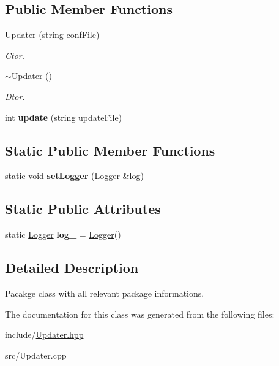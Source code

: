 \subsection*{Public Member Functions}
\begin{DoxyCompactItemize}
\item 
\hypertarget{classUpdater_aa950c2607183639f95deff560e001602}{\hyperlink{classUpdater_aa950c2607183639f95deff560e001602}{Updater} (string conf\-File)}\label{classUpdater_aa950c2607183639f95deff560e001602}

\begin{DoxyCompactList}\small\item\em Ctor. \end{DoxyCompactList}\item 
\hypertarget{classUpdater_a2f8434a97a4f3d3c716bb05abb20621e}{\hyperlink{classUpdater_a2f8434a97a4f3d3c716bb05abb20621e}{$\sim$\-Updater} ()}\label{classUpdater_a2f8434a97a4f3d3c716bb05abb20621e}

\begin{DoxyCompactList}\small\item\em Dtor. \end{DoxyCompactList}\item 
\hypertarget{classUpdater_ac3d8bfff7f81f340837d038a04265cfa}{int {\bfseries update} (string update\-File)}\label{classUpdater_ac3d8bfff7f81f340837d038a04265cfa}

\end{DoxyCompactItemize}
\subsection*{Static Public Member Functions}
\begin{DoxyCompactItemize}
\item 
\hypertarget{classUpdater_a48c4e237d38adfb1d8b725cc3aaf4432}{static void {\bfseries set\-Logger} (\hyperlink{classLogger}{Logger} \&log)}\label{classUpdater_a48c4e237d38adfb1d8b725cc3aaf4432}

\end{DoxyCompactItemize}
\subsection*{Static Public Attributes}
\begin{DoxyCompactItemize}
\item 
\hypertarget{classUpdater_a5b9b357996c983f688d47ce73197c6b6}{static \hyperlink{classLogger}{Logger} {\bfseries log\-\_\-} = \hyperlink{classLogger}{Logger}()}\label{classUpdater_a5b9b357996c983f688d47ce73197c6b6}

\end{DoxyCompactItemize}


\subsection{Detailed Description}
Pacakge class with all relevant package informations. 

The documentation for this class was generated from the following files\-:\begin{DoxyCompactItemize}
\item 
include/\hyperlink{Updater_8hpp}{Updater.\-hpp}\item 
src/Updater.\-cpp\end{DoxyCompactItemize}
